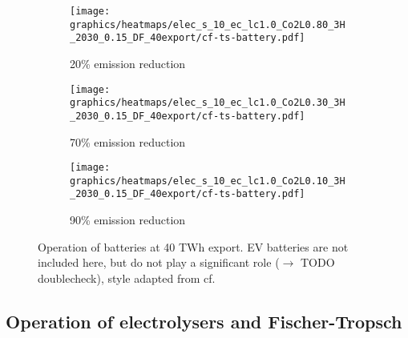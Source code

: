 \begin{figure}[h]
    \begin{subfigure}[h]{0.33\textwidth}
        \centering
        \texttt{[image: graphics/heatmaps/elec\_s\_10\_ec\_lc1.0\_Co2L0.80\_3H\_2030\_0.15\_DF\_40export/cf-ts-battery.pdf]}
        \caption{20\% emission reduction}
        \label{fig:operation20}
    \end{subfigure}
    \begin{subfigure}[h]{0.33\textwidth}
        \centering
        \texttt{[image: graphics/heatmaps/elec\_s\_10\_ec\_lc1.0\_Co2L0.30\_3H\_2030\_0.15\_DF\_40export/cf-ts-battery.pdf]}
        \caption{70\% emission reduction}
        \label{fig:operation70}
    \end{subfigure}
    \begin{subfigure}[h]{0.33\textwidth}
        \centering
        \texttt{[image: graphics/heatmaps/elec\_s\_10\_ec\_lc1.0\_Co2L0.10\_3H\_2030\_0.15\_DF\_40export/cf-ts-battery.pdf]}
        \caption{90\% emission reduction}
        \label{fig:operation90}
    \end{subfigure}

    \caption{Operation of batteries at 40 TWh export. EV batteries are not included here, but do not play a significant role ($\rightarrow$ TODO doublecheck), style adapted from cf. \cite{Neumann2022}}
    \label{fig:battery_operation}
\end{figure}



\subsection{Operation of electrolysers and Fischer-Tropsch}


